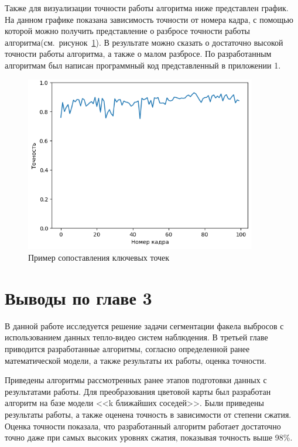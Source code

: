 \documentclass[14pt, a4paper]{extreport}
\begin{document}
	Также для визуализации точности работы алгоритма ниже представлен график. На данном графике показана зависимость точности от номера кадра, с помощью которой можно получить представление о разбросе точности работы алгоритма(см.~рисунок~\ref{fig:accuracy_itog_plot}). В результате можно сказать о достаточно высокой точности работы алгоритма, а также о малом разбросе. По разработанным алгоритмам был написан программный код представленный в приложении 1.
	\begin{figure}[h!]
		\centering
		\includegraphics[width = 0.9\textwidth]{image/chapter_3/accuracy_itog_plot}	
		\caption{Пример сопоставления ключевых точек}
		\label{fig:accuracy_itog_plot}
	\end{figure}
	
	
\section[Выводы по главе 3]{Выводы по главе 3}	
	В данной работе исследуется решение задачи сегментации факела выбросов с использованием данных тепло-видео систем наблюдения. В третьей главе приводится разработанные алгоритмы, согласно определенной ранее математической модели, а также результаты их работы, оценка точности.
	
	Приведены алгоритмы рассмотренных ранее этапов подготовки данных с результатами работы. Для преобразования цветовой карты был разработан алгоритм на базе модели <<k ближайших соседей>>. Были приведены результаты работы, а также оценена точность в зависимости от степени сжатия. Оценка точности показала, что разработанный алгоритм работает достаточно точно даже при самых высоких уровнях сжатия, показывая точность выше 98\%.
	
\end{document}
